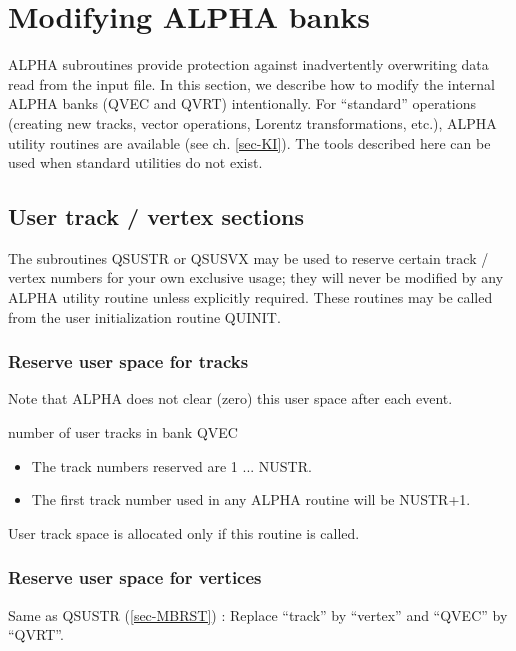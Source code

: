 \chapter{\label{sec-MB}Modifying ALPHA banks}
\par
ALPHA subroutines provide protection against inadvertently
overwriting data read from the
input file. In this section, we describe how to modify the internal
ALPHA
banks (QVEC and QVRT) intentionally.
For ``standard''
operations (creating new tracks,
vector operations, Lorentz transformations, etc.), ALPHA utility
routines are available (see ch. \ref{sec-KI}). The tools described
here
can be used when
standard utilities do not exist.
 
\section{\label{sec-MBU}User track / vertex sections}
\par
The subroutines QSUSTR or QSUSVX may be used to reserve certain
track / vertex numbers for your own exclusive usage; they will never
be
modified by any ALPHA utility routine unless explicitly required.
These routines may be called from the user initialization routine QUINIT.
 
\subsection{\label{sec-MBRST}Reserve user space for tracks}
\par
{}
\par
\par
Note that ALPHA does not clear (zero) this user space after each event.
\begin{indentlist}{ 3.50cm}{ 3.75cm}
number of user tracks in bank QVEC
\end{indentlist}
\begin{itemize}
\item The track numbers reserved are 1 ... NUSTR.
\item The first track number used in any ALPHA routine will be NUSTR+1.
\end{itemize}
User track space is allocated only if this routine is called.
\newpage 
\subsection{\label{sec-MBRSV}Reserve user space for vertices}
\par
{}
\par
\par
Same as QSUSTR (\ref{sec-MBRST}) :
Replace ``track'' by ``vertex'' and ``QVEC'' by ``QVRT''.
 
